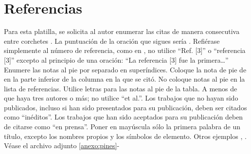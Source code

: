     \section*{Referencias}
    
    Para esta platilla, se solicita al autor enumerar las citas de manera consecutiva entre corchetes \cite{YLi2013}. 
    La puntuación de la oración que sigues sería \cite{Mesaelides2011}. 
    Refiérase simplemente al número de referencia, como en \cite{Morales2012}, no utilice “Ref. [3]” o “referencia [3]” excepto al principio de una oración: “La referencia [3] fue la primera…”
    Enumere las notas al pie por separado en superíndices. Coloque la nota de pie de en la parte inferior de la columna en la que se citó. No coloque notas al pie en la lista de referencias. Utilice letras para las notas al pie de la tabla.
    A menos de que haya tres autores o más; no utilice “et al.”. Los trabajos que no hayan sido publicados, incluso si han sido presentados para su publicación, deben ser citados como “inéditos”. Los trabajos que han sido aceptados para su publicación deben de citarse como “en prensa”. Poner en mayúscula sólo la primera palabra de un título, excepto los nombres propios y los símbolos de elemento. 
    Otros ejemplos \cite{LAAngeles2021}, \cite{LAAngelesConni}. 
    Véase el archivo adjunto \ref{anexo:pines}-
    
    
    
    
    
    \appendix
